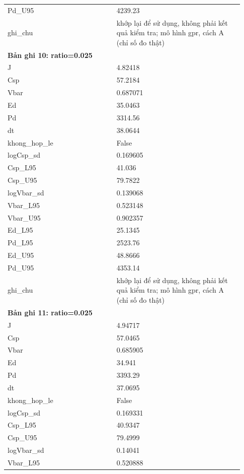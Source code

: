 \begin{longtable}{p{0.43\linewidth}p{0.50\linewidth}}
Pd\_\allowbreak U95 & 4239.23 \\
ghi\_\allowbreak chu & khớp lại để sử dụng, không phải kết quả kiểm tra; mô hình gpr, cách A (chỉ số đo thật) \\
\midrule
\multicolumn{2}{p{0.95\linewidth}}{\textbf{Bản ghi 10: ratio=0.025}} \\
J & 4.82418 \\
Csp & 57.2184 \\
Vbar & 0.687071 \\
Ed & 35.0463 \\
Pd & 3314.56 \\
dt & 38.0644 \\
khong\_\allowbreak hop\_\allowbreak le & False \\
logCsp\_\allowbreak sd & 0.169605 \\
Csp\_\allowbreak L95 & 41.036 \\
Csp\_\allowbreak U95 & 79.7822 \\
logVbar\_\allowbreak sd & 0.139068 \\
Vbar\_\allowbreak L95 & 0.523148 \\
Vbar\_\allowbreak U95 & 0.902357 \\
Ed\_\allowbreak L95 & 25.1345 \\
Pd\_\allowbreak L95 & 2523.76 \\
Ed\_\allowbreak U95 & 48.8666 \\
Pd\_\allowbreak U95 & 4353.14 \\
ghi\_\allowbreak chu & khớp lại để sử dụng, không phải kết quả kiểm tra; mô hình gpr, cách A (chỉ số đo thật) \\
\midrule
\multicolumn{2}{p{0.95\linewidth}}{\textbf{Bản ghi 11: ratio=0.025}} \\
J & 4.94717 \\
Csp & 57.0465 \\
Vbar & 0.685905 \\
Ed & 34.941 \\
Pd & 3393.29 \\
dt & 37.0695 \\
khong\_\allowbreak hop\_\allowbreak le & False \\
logCsp\_\allowbreak sd & 0.169331 \\
Csp\_\allowbreak L95 & 40.9347 \\
Csp\_\allowbreak U95 & 79.4999 \\
logVbar\_\allowbreak sd & 0.14041 \\
Vbar\_\allowbreak L95 & 0.520888 \\

\end{longtable}

